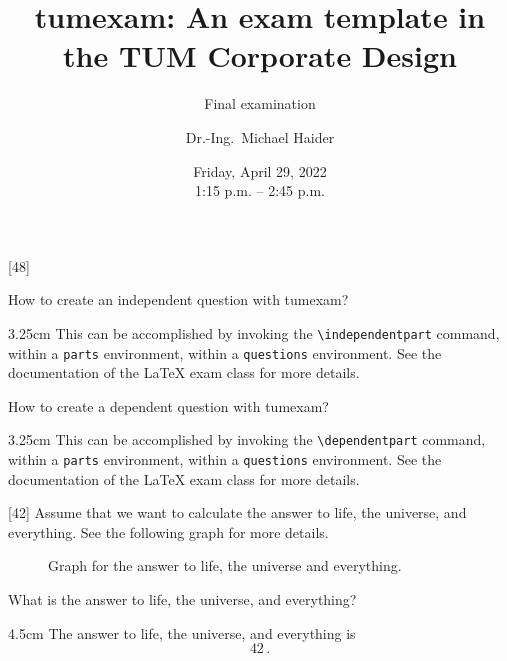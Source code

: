 \documentclass[english, @CLASSOPTIONS@]{tumexam}
\title{tumexam: An exam template in the TUM Corporate Design}
\subtitle{Final examination}
\author[orcid=0000-0002-5164-432X]{Dr.-Ing.\ Michael Haider}
\date{Friday, April 29, 2022\\
  1:15 p.m. -- 2:45 p.m.}
\begin{document}
\maketitle

\clearpage

\begin{questions}
  [48]
  \begin{parts}
    \independentpart
    How to create an independent question with tumexam?
    \begin{solutionbox}{3.25cm}
      This can be accomplished by invoking the \texttt{\textbackslash{independentpart}} command, within a \texttt{parts} environment, within a \texttt{questions} environment. See the documentation of the \LaTeX{} exam class for more details.
    \end{solutionbox}
    \dependentpart
    How to create a dependent question with tumexam?
    \begin{solutionbox}{3.25cm}
      This can be accomplished by invoking the \texttt{\textbackslash{dependentpart}} command, within a \texttt{parts} environment, within a \texttt{questions} environment. See the documentation of the \LaTeX{} exam class for more details.
    \end{solutionbox}
  \end{parts}
  \clearpage
  [42]
  Assume that we want to calculate the answer to life, the universe, and everything. See the following graph for more details.
  \begin{figure}[h]
    \centering
    \caption{Graph for the answer to life, the universe and everything.}
    \label{fig-graph-1}
  \end{figure}
  \begin{parts}
    \independentpart
    What is the answer to life, the universe, and everything?
    \begin{solutionbox}{4.5cm} %
      The answer to life, the universe, and everything is
      \begin{equation*}
        42\, .
      \end{equation*}
    \end{solutionbox}
  \end{parts}

\end{questions}
\end{document}
